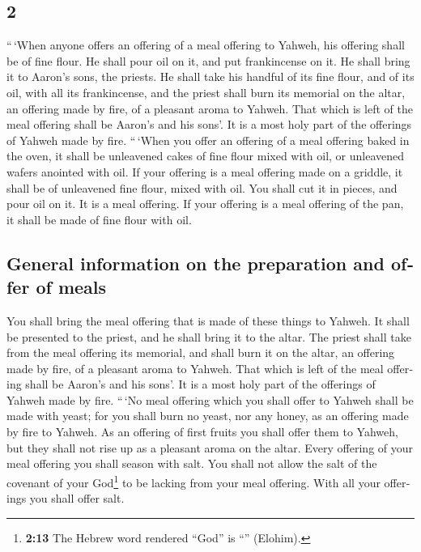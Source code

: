 \begin{paracol}{2}
\begin{otherlanguage}{english}
\hypertarget{section-3}{%
\section{2}\label{section-3}}

 ``\,`When anyone offers an offering of a meal offering to
Yahweh, his offering shall be of fine flour. He shall pour oil on it,
and put frankincense on it.  He shall bring it to Aaron's
sons, the priests. He shall take his handful of its fine flour, and of
its oil, with all its frankincense, and the priest shall burn its
memorial on the altar, an offering made by fire, of a pleasant aroma to
Yahweh.  That which is left of the meal offering shall be
Aaron's and his sons'. It is a most holy part of the offerings of Yahweh
made by fire.  ``\,`When you offer an offering of a meal
offering baked in the oven, it shall be unleavened cakes of fine flour
mixed with oil, or unleavened wafers anointed with oil. 
If your offering is a meal offering made on a griddle, it shall be of
unleavened fine flour, mixed with oil.  You shall cut it
in pieces, and pour oil on it. It is a meal offering.  If
your offering is a meal offering of the pan, it shall be made of fine
flour with oil.

\hypertarget{general-information-on-the-preparation-and-offer-of-meals}{%
\subsection{General information on the preparation and offer of
meals}\label{general-information-on-the-preparation-and-offer-of-meals}}

 You shall bring the meal offering that is made of these
things to Yahweh. It shall be presented to the priest, and he shall
bring it to the altar.  The priest shall take from the
meal offering its memorial, and shall burn it on the altar, an offering
made by fire, of a pleasant aroma to Yahweh.  That which
is left of the meal offering shall be Aaron's and his sons'. It is a
most holy part of the offerings of Yahweh made by fire. 
``\,`No meal offering which you shall offer to Yahweh shall be made with
yeast; for you shall burn no yeast, nor any honey, as an offering made
by fire to Yahweh.  As an offering of first fruits you
shall offer them to Yahweh, but they shall not rise up as a pleasant
aroma on the altar.  Every offering of your meal offering
you shall season with salt. You shall not allow the salt of the covenant
of your God\footnote{\textbf{2:13} The Hebrew word rendered ``God'' is
  ``'' (Elohim).} to be lacking from your meal offering.
With all your offerings you shall offer salt.


\end{otherlanguage}
\end{paracol}
